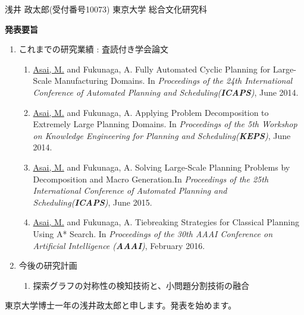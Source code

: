 





\begin{outline-text-1}
\begin{smaller}
\begin{center}
浅井 政太郎(受付番号10073) 東京大学 総合文化研究科
\end{center}
\end{smaller}
\textbf{発表要旨}

\begin{smaller}
\begin{expanded}
\begin{enumerate}
\item これまでの研究業績 : 査読付き学会論文
\begin{enumerate}
\item \uline{Asai, M.} and Fukunaga, A. Fully Automated Cyclic Planning for Large-Scale Manufacturing Domains. In \emph{Proceedings of the 24th International Conference of Automated Planning and Scheduling(\textbf{ICAPS})}, June 2014.
\item \uline{Asai, M.} and Fukunaga, A. Applying Problem Decomposition to Extremely Large Planning Domains. In \emph{Proceedings of the 5th Workshop on Knowledge Engineering for Planning and Scheduling(\textbf{KEPS})}, June 2014.
\item \uline{Asai, M.} and Fukunaga, A. Solving Large-Scale Planning Problems by Decomposition and Macro Generation.In \emph{Proceedings of the 25th International Conference of Automated Planning and Scheduling(\textbf{ICAPS})}, June 2015.
\item \uline{Asai, M.} and Fukunaga, A. Tiebreaking Strategies for Classical Planning Using A* Search. In \emph{Proceedings of the 30th AAAI Conference on Artificial Intelligence (\textbf{AAAI})}, February 2016.
\end{enumerate}
\item 今後の研究計画
\begin{enumerate}
\item 探索グラフの対称性の検知技術と、小問題分割技術の融合
\end{enumerate}
\end{enumerate}
\end{expanded}
\end{smaller}

\begin{resume}
東京大学博士一年の浅井政太郎と申します。発表を始めます。
\end{resume}
\end{outline-text-1}

